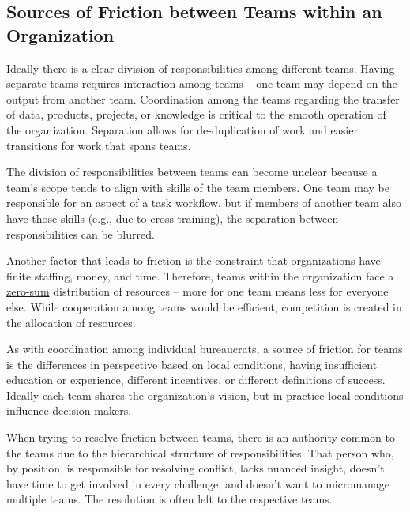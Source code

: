 \subsection*{Sources of Friction between Teams within an Organization}

Ideally there is a clear division of responsibilities among different teams. Having separate teams requires interaction among teams -- one team may depend on the output from another team. Coordination among the teams regarding the transfer of data, products, projects, or knowledge is critical to the smooth operation of the organization. Separation allows for de-duplication of work and easier transitions for work that spans teams. 

The division of  responsibilities between teams can become unclear because a team's scope tends to align with skills of the team members. One team may be responsible for an aspect of a task workflow, but if members of another team also have those skills (e.g., due to cross-training), the separation between responsibilities can be blurred. 
 

Another factor that leads to friction is the constraint that organizations have finite staffing, money, and time. Therefore, teams within the organization face a \href{https://en.wikipedia.org/wiki/Zero-sum_game}{zero-sum}
distribution of resources -- more for one team means less for everyone else. While cooperation among teams would be efficient, competition is created in the allocation of resources.

As with coordination among individual bureaucrats, a source of friction for teams is the differences in perspective based on local conditions, having insufficient education or experience, different incentives, or different definitions of success. Ideally each team shares the organization's vision, but in practice local conditions influence decision-makers.

When trying to resolve friction between teams, there is an authority common to the teams due to the hierarchical structure of responsibilities. That person who, by position, is responsible for resolving conflict, lacks nuanced insight, doesn't have time to get involved in every challenge, and doesn't want to micromanage multiple teams. The resolution is often left to the respective teams. 


